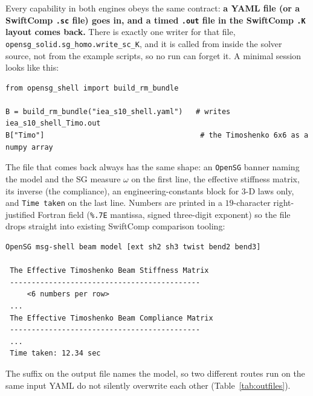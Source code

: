 Every capability in both engines obeys the same contract: \textbf{a YAML file (or
a SwiftComp \texttt{.sc} file) goes in, and a timed \texttt{.out} file in the
SwiftComp \texttt{.K} layout comes back.} There is exactly one writer for that
file, \texttt{opensg\_solid.sg\_homo.write\_sc\_K}, and it is called from inside
the solver source, not from the example scripts, so no run can forget it. A
minimal session looks like this:

\begin{lstlisting}[style=opensg,caption={The whole contract: the .out file is written as a side effect of the call.},basicstyle=\ttfamily\footnotesize]
from opensg_shell import build_rm_bundle

B = build_rm_bundle("iea_s10_shell.yaml")   # writes iea_s10_shell_Timo.out
B["Timo"]                                    # the Timoshenko 6x6 as a numpy array
\end{lstlisting}

The file that comes back always has the same shape: an \texttt{OpenSG} banner
naming the model and the SG measure $\omega$ on the first line, the effective
stiffness matrix, its inverse (the compliance), an engineering-constants block
for 3-D laws only, and \texttt{Time taken} on the last line. Numbers are printed
in a $19$-character right-justified Fortran field
(\verb|%.7E| mantissa, signed three-digit exponent) so the file drops straight
into existing SwiftComp comparison tooling:

\begin{Verbatim}[frame=single,fontsize=\small,samepage=false]
 OpenSG msg-shell beam model [ext sh2 sh3 twist bend2 bend3]

 The Effective Timoshenko Beam Stiffness Matrix
 --------------------------------------------
     <6 numbers per row>
 ...
 The Effective Timoshenko Beam Compliance Matrix
 --------------------------------------------
 ...
 Time taken: 12.34 sec
\end{Verbatim}

The suffix on the output file names the model, so two different routes run on
the same input YAML do not silently overwrite each other
(Table~\ref{tab:outfiles}).

